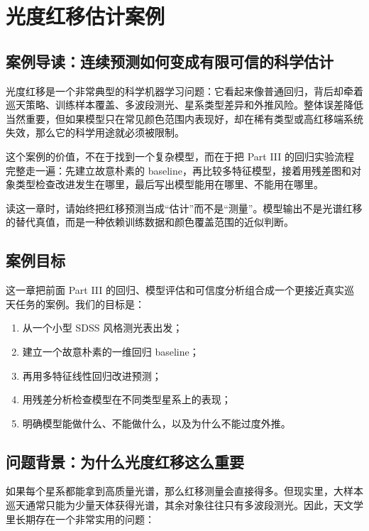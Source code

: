 \chapter{光度红移估计案例}

\section{案例导读：连续预测如何变成有限可信的科学估计}

光度红移是一个非常典型的科学机器学习问题：它看起来像普通回归，背后却牵着巡天策略、训练样本覆盖、多波段测光、星系类型差异和外推风险。整体误差降低当然重要，但如果模型只在常见颜色范围内表现好，却在稀有类型或高红移端系统失效，那么它的科学用途就必须被限制。

这个案例的价值，不在于找到一个复杂模型，而在于把 Part III 的回归实验流程完整走一遍：先建立故意朴素的 baseline，再比较多特征模型，接着用残差图和对象类型检查改进发生在哪里，最后写出模型能用在哪里、不能用在哪里。

读这一章时，请始终把红移预测当成“估计”而不是“测量”。模型输出不是光谱红移的替代真值，而是一种依赖训练数据和颜色覆盖范围的近似判断。

\section{案例目标}

这一章把前面 Part III 的回归、模型评估和可信度分析组合成一个更接近真实巡天任务的案例。我们的目标是：

\begin{enumerate}
    \item 从一个小型 SDSS 风格测光表出发；
    \item 建立一个故意朴素的一维回归 baseline；
    \item 再用多特征线性回归改进预测；
    \item 用残差分析检查模型在不同类型星系上的表现；
    \item 明确模型能做什么、不能做什么，以及为什么不能过度外推。
\end{enumerate}

\section{问题背景：为什么光度红移这么重要}

如果每个星系都能拿到高质量光谱，那么红移测量会直接得多。但现实里，大样本巡天通常只能为少量天体获得光谱，其余对象往往只有多波段测光。因此，天文学里长期存在一个非常实用的问题：

